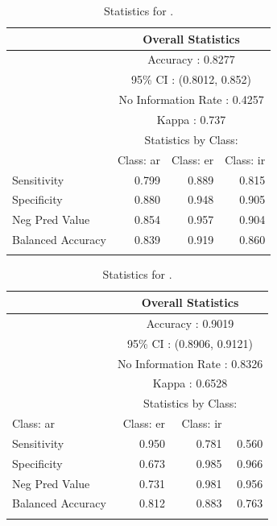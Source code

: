 \begin{table}
  \centering
    \begin{tabular}{lrrr}
      \lsptoprule
      & \multicolumn{3}{c}{Overall Statistics}                \\
      \midrule
      & \multicolumn{3}{c}{Accuracy : 0.8277}                 \\
      & \multicolumn{3}{c}{95\% CI : (0.8012, 0.852)}         \\
      & \multicolumn{3}{c}{No Information Rate : 0.4257}      \\
      & \multicolumn{3}{c}{Kappa : 0.737}                     \\
      \midrule
      & \multicolumn{3}{c}{Statistics by Class:}              \\
      \midrule
   & Class: ar & Class: er & Class: ir \\
      \midrule
      Sensitivity       & 0.799     & 0.889     & 0.815     \\
      Specificity       & 0.880     & 0.948     & 0.905     \\
      Neg Pred Value    & 0.854     & 0.957     & 0.904     \\
      Balanced Accuracy & 0.839     & 0.919     & 0.860     \\
      \lspbottomrule
    \end{tabular}
    \caption{Statistics for .}
    \label{tab:spanish-verbs-theme-v-stats}
\end{table}

\begin{table}
    \begin{tabular}{lrrr}
      \lsptoprule
      &\multicolumn{3}{c}{Overall Statistics}                \\
      \midrule
      & \multicolumn{3}{c}{Accuracy : 0.9019}                 \\
      & \multicolumn{3}{c}{95\% CI : (0.8906, 0.9121)}         \\
      & \multicolumn{3}{c}{No Information Rate : 0.8326}      \\
      & \multicolumn{3}{c}{Kappa : 0.6528}                     \\
      \midrule
      & \multicolumn{3}{c}{Statistics by Class:}              \\
      \midrule
   Class: ar & Class: er & Class: ir \\
      \midrule
      Sensitivity       & 0.950&   0.781&   0.560\\
      Specificity       & 0.673&   0.985&   0.966\\
      Neg Pred Value    & 0.731&   0.981&   0.956\\
      Balanced Accuracy & 0.812&   0.883&   0.763\\
      \lspbottomrule
    \end{tabular}
    \caption{Statistics for .}
    \label{tab:spanish-verbs-theme-v-stats-2}
\end{table}
\clearpage  

